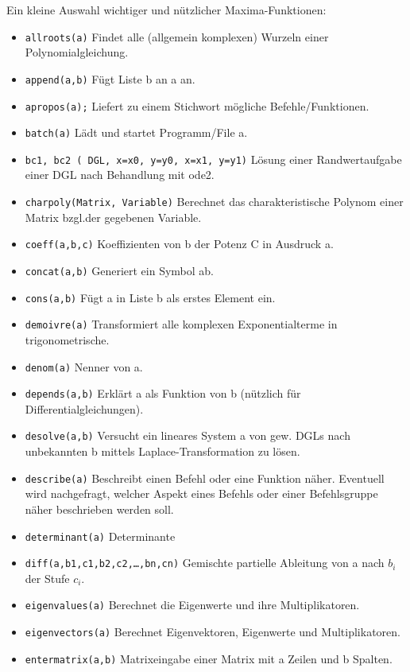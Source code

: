 \documentclass[12pt]{scrartcl}
\begin{document}
Ein kleine Auswahl wichtiger und nützlicher Maxima-Funktionen:

\begin{itemize}
\item \texttt{allroots(a)} Findet alle (allgemein komplexen) Wurzeln
  einer  Polynomialgleichung.
\item \texttt{append(a,b)} Fügt Liste b an a an.
\item \texttt{apropos(a);} Liefert zu einem Stichwort mögliche Befehle/Funktionen.
\item \texttt{batch(a)} Lädt und startet Programm/File a.
\item \texttt{bc1, bc2 ( DGL, x=x0, y=y0, x=x1, y=y1)} Lösung einer
  Randwertaufgabe einer DGL nach Behandlung mit ode2.
\item \texttt{charpoly(Matrix, Variable)} Berechnet das
  charakteristische Polynom einer Matrix bzgl.\@ der gegebenen  Variable.
\item \texttt{coeff(a,b,c)} Koeffizienten von b der Potenz C in Ausdruck a.
\item \texttt{concat(a,b)} Generiert ein Symbol ab.
\item \texttt{cons(a,b)} Fügt a in Liste b als erstes Element ein.
\item \texttt{demoivre(a)} Transformiert alle komplexen Exponentialterme in trigonometrische.
\item \texttt{denom(a)} Nenner von a.
\item \texttt{depends(a,b)} Erklärt a als Funktion von b (nützlich für Differentialgleichungen).
\item \texttt{desolve(a,b)} Versucht ein lineares System a von gew. DGLs
  nach unbekannten b mittels Laplace-Transformation  zu lösen.
\item \texttt{describe(a)} Beschreibt einen Befehl oder eine Funktion
  näher.  Eventuell wird nachgefragt, welcher Aspekt eines Befehls oder
  einer Befehlsgruppe näher beschrieben  werden soll.
\item \texttt{determinant(a)} Determinante
\item \texttt{diff(a,b1,c1,b2,c2,\ldots,bn,cn)} Gemischte partielle Ableitung von a nach $b_i$ der Stufe $c_i$.
\item \texttt{eigenvalues(a)} Berechnet die Eigenwerte und ihre Multiplikatoren.
\item \texttt{eigenvectors(a)} Berechnet Eigenvektoren, Eigenwerte und  Multiplikatoren.
\item \texttt{entermatrix(a,b)} Matrixeingabe einer Matrix mit a Zeilen und b Spalten.

\end{itemize}
\end{document}
